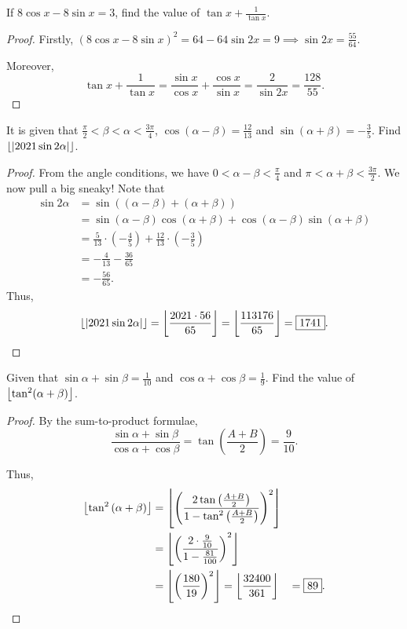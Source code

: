 \documentclass[../main.tex]{subfiles}
\begin{document}
\begin{example}[2020 SMO(S) P9]
If $8\cos{x}-8\sin{x}=3$, find the value of $\tan{x}+\frac{1}{\tan{x}}$.
\end{example}
\begin{proof}
    Firstly, $(8\cos{x}-8\sin{x})^2=64-64\sin{2x}=9 \implies \sin{2x}=\frac{55}{64}$.
    
    Moreover, $$\tan{x}+\frac{1}{\tan{x}}=\frac{\sin{x}}{\cos{x}}+\frac{\cos{x}}{\sin{x}}=\frac{2}{\sin{2x}}=\boxed{\frac{128}{55}}.$$
\end{proof}

\begin{example}[2021 SMO(O) P1]
    It is given that $\frac{\pi}{2}<\beta<\alpha<\frac{3\pi}{4}$, $\cos{(\alpha-\beta)}=\frac{12}{13}$ and $\sin{(\alpha+\beta)}=-\frac{3}{5}$. Find $\left\lfloor |2021\sin{2\alpha}| \right\rfloor$.
\end{example}
\begin{proof}
    From the angle conditions, we have $0<\alpha-\beta<\frac{\pi}{4}$ and $\pi<\alpha+\beta<\frac{3\pi}{2}$. We now pull a big sneaky! Note that 
    \begin{align*}
        \sin{2\alpha}&=\sin{((\alpha-\beta)+(\alpha+\beta))} \\
        &=\sin{(\alpha-\beta)}\cos{(\alpha+\beta)}+\cos{(\alpha-\beta)}\sin{(\alpha+\beta)} \\
        &=\frac{5}{13}\cdot\left(-\frac{4}{5}\right)+\frac{12}{13}\cdot\left(-\frac{3}{5}\right) \\
        &=-\frac{4}{13}-\frac{36}{65} \\
        &=-\frac{56}{65}.
    \end{align*}
    Thus, $$\left\lfloor |2021\sin{2\alpha}| \right\rfloor=\left\lfloor \frac{2021\cdot56}{65} \right\rfloor=\left\lfloor \frac{113176}{65} \right\rfloor=\boxed{1741}.$$
\end{proof}


\begin{example}[2021 SMO(O) P12]
    Given that $\sin{\alpha}+\sin{\beta}=\frac{1}{10}$ and $\cos{\alpha}+\cos{\beta}=\frac{1}{9}$. Find the value of $\left\lfloor \tan^2(\alpha+\beta) \right\rfloor$.
\end{example}
\begin{proof}
    By the sum-to-product formulae,
    $$\frac{\sin{\alpha}+\sin{\beta}}{\cos{\alpha}+\cos{\beta}}=\tan{\left(\frac{A+B}{2}\right)}=\frac{9}{10}.$$

    Thus,
    \begin{align*}
        \left\lfloor \tan^2{(\alpha+\beta)} \right\rfloor&=\left\lfloor \left(\frac{2\tan{\left(\frac{A+B}{2}\right)}}{1-\tan^2{\left(\frac{A+B}{2}\right)}}\right)^2 \right\rfloor\\
        &=\left\lfloor \left(\frac{2\cdot\frac{9}{10}}{1-\frac{81}{100}}\right)^2 \right\rfloor\\
        &=\left\lfloor \left(\frac{180}{19}\right)^2 \right\rfloor=\left\lfloor \frac{32400}{361} \right\rfloor
        &=\boxed{89}.
    \end{align*}
\end{proof}
\end{document}
